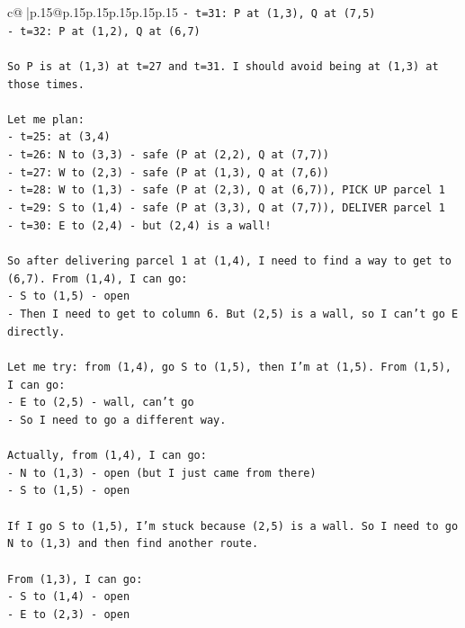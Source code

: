 \documentclass{article}
\begin{document}
{\begin{supertabular}{c@{$\;$}|p{.15\linewidth}@{}p{.15\linewidth}p{.15\linewidth}p{.15\linewidth}p{.15\linewidth}p{.15\linewidth}}
{{{\texttt{{-} t=31: P at (1,3), Q at (7,5)} \\
\texttt{{-} t=32: P at (1,2), Q at (6,7)} \\
\\ 
\texttt{So P is at (1,3) at t=27 and t=31. I should avoid being at (1,3) at those times.} \\
\\ 
\texttt{Let me plan:} \\
\texttt{{-} t=25: at (3,4)} \\
\texttt{{-} t=26: N to (3,3) {-} safe (P at (2,2), Q at (7,7))} \\
\texttt{{-} t=27: W to (2,3) {-} safe (P at (1,3), Q at (7,6))} \\
\texttt{{-} t=28: W to (1,3) {-} safe (P at (2,3), Q at (6,7)), PICK UP parcel 1} \\
\texttt{{-} t=29: S to (1,4) {-} safe (P at (3,3), Q at (7,7)), DELIVER parcel 1} \\
\texttt{{-} t=30: E to (2,4) {-} but (2,4) is a wall!} \\
\\ 
\texttt{So after delivering parcel 1 at (1,4), I need to find a way to get to (6,7). From (1,4), I can go:} \\
\texttt{{-} S to (1,5) {-} open} \\
\texttt{{-} Then I need to get to column 6. But (2,5) is a wall, so I can't go E directly.} \\
\\ 
\texttt{Let me try: from (1,4), go S to (1,5), then I'm at (1,5). From (1,5), I can go:} \\
\texttt{{-} E to (2,5) {-} wall, can't go} \\
\texttt{{-} So I need to go a different way.} \\
\\ 
\texttt{Actually, from (1,4), I can go:} \\
\texttt{{-} N to (1,3) {-} open (but I just came from there)} \\
\texttt{{-} S to (1,5) {-} open} \\
\\ 
\texttt{If I go S to (1,5), I'm stuck because (2,5) is a wall. So I need to go N to (1,3) and then find another route.} \\
\\ 
\texttt{From (1,3), I can go:} \\
\texttt{{-} S to (1,4) {-} open} \\
\texttt{{-} E to (2,3) {-} open} \\
}}}
\end{supertabular}}
\end{document}
